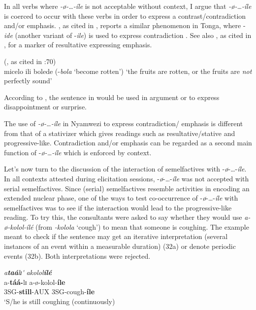 \documentclass[output=paper,newtxmath,modfonts,nonflat,draftmode]{langsci/langscibook}
\begin{document}
In all verbs where \textit{-ø}\textit{-…-íle} is not acceptable without context, I argue that \textit{-ø}\textit{-…-íle} is coerced to occur with these verbs in order to express a contrast/contradiction and/or emphasis. \citet{Collins1962}, as cited in \citet[70]{Crane2012}, reports a similar phenomenon in Tonga, where -\textit{ide} (another variant of -\textit{ile}) is used to express contradiction . See also \citet{Woidich1975}, as cited in \citet[194]{Ebert1995}, for a marker of resultative expressing emphasis. 

\ea \label{ex:kanijo:31}  (\citealt{Collins1962}, as cited in \citealt{Crane2012}:70)\\
micelo ili bolede (-\textit{bola} ‘become rotten’)
\glt   ‘the fruits are rotten, or the fruits are \textit{not} perfectly sound’ 
\z

According to \citet{Collins1962}, the sentence in  would be used in argument or to express disappointment or surprise. 

The use of \textit{-ø}\textit{-…-íle} in Nyamwezi to express contradiction/ emphasis is different from that of a stativizer which gives readings such as resultative/stative and progressive-like. Contradiction and/or emphasis can be regarded as a second main function of -\textit{ø-…-íle} which is enforced by context. 

Let’s now turn to the discussion of the interaction of semelfactives with -\textit{ø}-…-\textit{íle}. In all contexts attested during elicitation sessions, -\textit{ø}-…-\textit{íle} was not accepted with serial semelfactives. Since (serial) semelfactives resemble activities in encoding an extended nuclear phase, one of the ways to test co-occurrence of -\textit{ø}-…-\textit{íle} with semelfactives was to see if the interaction would lead to the progressive-like reading. To try this, the consultants were asked to say whether they would use \textit{a-ø}\textit{-kolol-ílé} (from \textit{-kolola} ‘cough’) to mean that someone is coughing. The example meant to check if the sentence may get an iterative interpretation (several instances of an event within a measurable duration) (32a) or denote periodic events (32b). Both interpretations were rejected. 

\ea \label{ex:kanijo:32}
\ea  \glll *\textit{a}\textbf{\textit{taá}}\textit{lɪ}\textit{\'{} }              \textit{akolol}\textbf{\textit{ílé}}\\
      a-\textbf{táá-}lɪ            a-ø-kolol-\textbf{íle}\\
      3SG-\textbf{still}-AUX 3SG-cough-\textbf{íle}\\
      \glt ‘S/he is still coughing (continuously)
\end{document}
